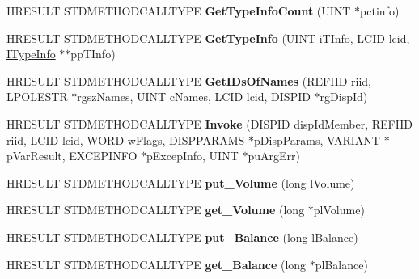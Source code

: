\begin{DoxyCompactItemize}
\item 
\mbox{\label{class_c_ks_basic_audio_af5f77bac05658ce8890852c596745be2}} 
H\+R\+E\+S\+U\+LT S\+T\+D\+M\+E\+T\+H\+O\+D\+C\+A\+L\+L\+T\+Y\+PE {\bfseries Get\+Type\+Info\+Count} (U\+I\+NT $\ast$pctinfo)
\item 
\mbox{\label{class_c_ks_basic_audio_a8ea6d51c0f39774cb487e5e792d07ad0}} 
H\+R\+E\+S\+U\+LT S\+T\+D\+M\+E\+T\+H\+O\+D\+C\+A\+L\+L\+T\+Y\+PE {\bfseries Get\+Type\+Info} (U\+I\+NT i\+T\+Info, L\+C\+ID lcid, \hyperlink{interface_i_type_info}{I\+Type\+Info} $\ast$$\ast$pp\+T\+Info)
\item 
\mbox{\label{class_c_ks_basic_audio_abc08d59ffd28c8e285ba123e6a3ef73e}} 
H\+R\+E\+S\+U\+LT S\+T\+D\+M\+E\+T\+H\+O\+D\+C\+A\+L\+L\+T\+Y\+PE {\bfseries Get\+I\+Ds\+Of\+Names} (R\+E\+F\+I\+ID riid, L\+P\+O\+L\+E\+S\+TR $\ast$rgsz\+Names, U\+I\+NT c\+Names, L\+C\+ID lcid, D\+I\+S\+P\+ID $\ast$rg\+Disp\+Id)
\item 
\mbox{\label{class_c_ks_basic_audio_a8434079e377daeb312d853a020a2b3d5}} 
H\+R\+E\+S\+U\+LT S\+T\+D\+M\+E\+T\+H\+O\+D\+C\+A\+L\+L\+T\+Y\+PE {\bfseries Invoke} (D\+I\+S\+P\+ID disp\+Id\+Member, R\+E\+F\+I\+ID riid, L\+C\+ID lcid, W\+O\+RD w\+Flags, D\+I\+S\+P\+P\+A\+R\+A\+MS $\ast$p\+Disp\+Params, \hyperlink{structtag_v_a_r_i_a_n_t}{V\+A\+R\+I\+A\+NT} $\ast$p\+Var\+Result, E\+X\+C\+E\+P\+I\+N\+FO $\ast$p\+Excep\+Info, U\+I\+NT $\ast$pu\+Arg\+Err)
\item 
\mbox{\label{class_c_ks_basic_audio_a540420968723a4e7a20c7f17aed1d2ac}} 
H\+R\+E\+S\+U\+LT S\+T\+D\+M\+E\+T\+H\+O\+D\+C\+A\+L\+L\+T\+Y\+PE {\bfseries put\+\_\+\+Volume} (long l\+Volume)
\item 
\mbox{\label{class_c_ks_basic_audio_a46185ef2f5ad7798305b42665c5ad44a}} 
H\+R\+E\+S\+U\+LT S\+T\+D\+M\+E\+T\+H\+O\+D\+C\+A\+L\+L\+T\+Y\+PE {\bfseries get\+\_\+\+Volume} (long $\ast$pl\+Volume)
\item 
\mbox{\label{class_c_ks_basic_audio_a75e157f2aea250a7d7a079fd32e38566}} 
H\+R\+E\+S\+U\+LT S\+T\+D\+M\+E\+T\+H\+O\+D\+C\+A\+L\+L\+T\+Y\+PE {\bfseries put\+\_\+\+Balance} (long l\+Balance)
\item 
\mbox{\label{class_c_ks_basic_audio_af29df276f43b8b13d5c2f0df8e1527c7}} 
H\+R\+E\+S\+U\+LT S\+T\+D\+M\+E\+T\+H\+O\+D\+C\+A\+L\+L\+T\+Y\+PE {\bfseries get\+\_\+\+Balance} (long $\ast$pl\+Balance)
\end{DoxyCompactItemize}
